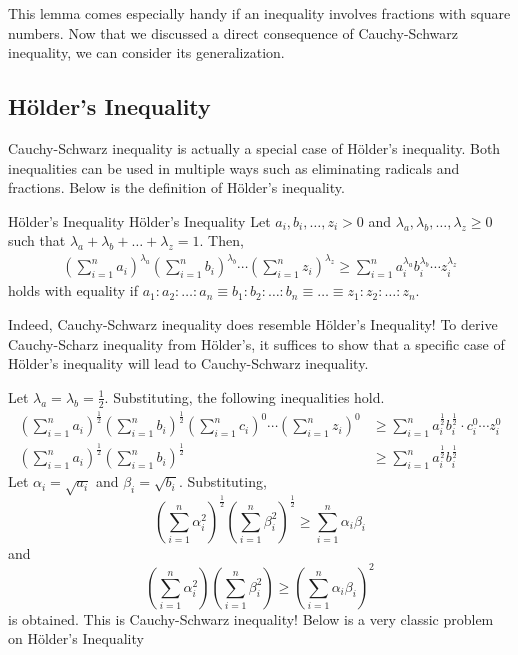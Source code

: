 \documentclass[../main.tex]{subfiles}
\begin{document}
This lemma comes especially handy if an inequality involves
fractions with square numbers. Now that we discussed a direct
consequence of Cauchy-Schwarz inequality, we can consider its
generalization.

\subsection{Hölder's Inequality}

Cauchy-Schwarz inequality is actually a special case of Hölder's
inequality. Both inequalities can be used in multiple ways such as
eliminating radicals and fractions. Below is the definition of
Hölder's inequality.

\begin{definition}
{Hölder's Inequality}
{Hölder's Inequality}
Let $a_i, b_i, \ldots, z_i > 0$ and $\lambda_a, \lambda_b, \ldots,
\lambda_z \geq 0$ such that $\lambda_a + \lambda_b + \dots +
\lambda_z = 1$. Then,
\begin{align*}
\left( \sum_{i=1}^n a_i \right)^{\lambda_a}
\left( \sum_{i=1}^n b_i \right)^{\lambda_b} \cdots
\left( \sum_{i=1}^n z_i \right)^{\lambda_z}
\geq
    \sum_{i=1}^n a_i^{\lambda_a} b_i^{\lambda_b}
        \cdots z_i^{\lambda_z}
\end{align*}
holds with equality if $a_1 : a_2 : \dots : a_n \equiv b_1 : b_2 :
\dots : b_n \equiv \dots \equiv z_1 : z_2 : \dots : z_n$.
\end{definition}

Indeed, Cauchy-Schwarz inequality does resemble Hölder's Inequality!
To derive Cauchy-Scharz inequality from Hölder's, it suffices to show
that a specific case of Hölder's inequality will lead to
Cauchy-Schwarz inequality.

Let $\lambda_a = \lambda_b = \frac{1}{2}$. Substituting, the following
inequalities hold.
\begin{align*}
    \left( \sum_{i=1}^n a_i \right)^\frac{1}{2}
    \left( \sum_{i=1}^n b_i \right)^\frac{1}{2}
    \left( \sum_{i=1}^n c_i \right)^0 \cdots
    \left( \sum_{i=1}^n z_i \right)^0
    &\geq
    \sum_{i=1}^n
        a_i^{\frac{1}{2}} b_i^{\frac{1}{2}} \cdot
        c_i^0 \cdots z_i^0 \\
    \left( \sum_{i=1}^n a_i \right)^\frac{1}{2}
    \left( \sum_{i=1}^n b_i \right)^\frac{1}{2}
    &\geq
    \sum_{i=1}^n a_i^\frac{1}{2} b_i^\frac{1}{2}
\end{align*}
Let $\alpha_i = \sqrt{a_i}$ and $\beta_i = \sqrt{b_i}$. Substituting,
\[
\left( \sum_{i=1}^n \alpha_i^2 \right)^\frac{1}{2}
\left( \sum_{i=1}^n \beta_i^2 \right)^\frac{1}{2}
\geq
\sum_{i=1}^n \alpha_i \beta_i
\]
and
\[
\left( \sum_{i=1}^n \alpha_i^2 \right)
\left( \sum_{i=1}^n \beta_i^2 \right)
\geq
\left( \sum_{i=1}^n \alpha_i \beta_i \right)^2
\]
is obtained. This is Cauchy-Schwarz inequality! Below is a very
classic problem on Hölder's Inequality
\end{document}

